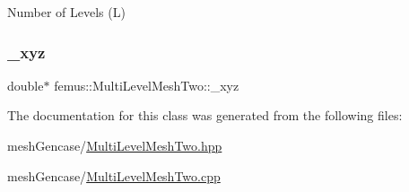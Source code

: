 Number of Levels (L) 

\mbox{\label{classfemus_1_1_multi_level_mesh_two_aeee8551d149cdd762f5e493297ac2426}} 
\subsubsection{\texorpdfstring{\+\_\+xyz}{\_xyz}}
{\footnotesize\ttfamily double$\ast$ femus\+::\+Multi\+Level\+Mesh\+Two\+::\+\_\+xyz}



The documentation for this class was generated from the following files\+:\begin{DoxyCompactItemize}
\item 
mesh\+Gencase/\mbox{\hyperlink{_multi_level_mesh_two_8hpp}{Multi\+Level\+Mesh\+Two.\+hpp}}\item 
mesh\+Gencase/\mbox{\hyperlink{_multi_level_mesh_two_8cpp}{Multi\+Level\+Mesh\+Two.\+cpp}}\end{DoxyCompactItemize}
